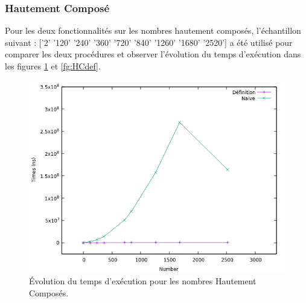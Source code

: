 	\subsubsection{Hautement Composé}
	Pour les deux fonctionnalités sur les nombres hautement composés, l'échantillon suivant : ['2' '120' '240' '360' '720' '840' '1260' '1680' '2520'] a été utilisé pour comparer les deux procédures et observer l'évolution du temps d'exécution dans les figures \ref{fg:HC} et \ref{fg:HCdef}.\\
	\begin{figure}[!ht]	
		\begin{center}\includegraphics[scale=0.5]{HC.png}\end{center}
		\caption{Évolution du temps d'exécution pour les nombres Hautement Composés.}
		\label{fg:HC}
	\end{figure}
	
